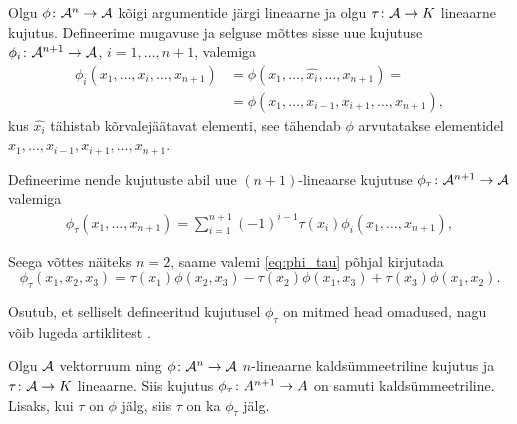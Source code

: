 Olgu $\phi \colon \mathcal{A}^n \to \mathcal{A}$ kõigi argumentide järgi lineaarne ja
olgu $\tau \colon \mathcal{A} \to K$ lineaarne kujutus. Defineerime mugavuse
ja selguse mõttes sisse uue kujutuse $\phi_i \colon \mathcal{A}^{n+1} \to \mathcal{A}$,
$i = 1, \dots, n+1$, valemiga
\begin{align*}
    \phi_i\left(x_1, \dots, x_i, \dots, x_{n+1}\right) &=
    \phi \left(x_1, \dots, \hat{x_i}, \dots, x_{n+1}\right) = \\
    &= \phi \left(x_1, \dots, x_{i-1}, x_{i+1}, \dots, x_{n+1}\right),
\end{align*}
kus $\hat{x_i}$ tähistab kõrvalejäätavat elementi, see tähendab
$\phi$ arvutatakse elementidel $x_1, \dots, x_{i-1}, x_{i+1}, \dots, x_{n+1}$.

Defineerime nende
kujutuste abil uue $(n+1)$-lineaarse kujutuse
$\phi_\tau \colon \mathcal{A}^{n+1} \to \mathcal{A}$ valemiga
\begin{align}\label{eq:phi_tau}
    \phi_\tau \left( x_1, \dots, x_{n+1} \right) =
    \sum_{i=1}^{n+1} (-1)^{i-1} \tau(x_i)
        \phi_i(x_1, \dots, x_{n+1}),
\end{align}


Seega võttes näiteks $n = 2$, saame valemi \eqref{eq:phi_tau}
põhjal kirjutada
\[
    \phi_\tau (x_1, x_2, x_3) =
        \tau(x_1) \phi(x_2, x_3) -
        \tau(x_2) \phi(x_1, x_3) +
        \tau(x_3) \phi(x_1, x_2).
\]

Osutub, et selliselt defineeritud kujutusel $\phi_\tau$ on
mitmed head omadused, nagu võib lugeda artiklitest \cite{AKMS:2014,AMS:2011}.

\begin{lemma}
    Olgu $\mathcal{A}$ vektorruum ning $\phi \colon \mathcal{A}^n \to \mathcal{A}$ $n$-lineaarne
    kaldsümmeetriline kujutus ja $\tau \colon \mathcal{A} \to K$ lineaarne.
    Siis kujutus $\phi_\tau \colon A^{n+1} \to A$ on samuti
    kaldsümmeetriline. Lisaks, kui $\tau$ on $\phi$ jälg, siis
    $\tau$ on ka $\phi_\tau$ jälg.
\end{lemma}

